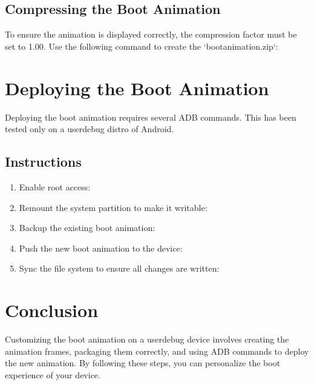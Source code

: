   \subsection{Compressing the Boot Animation}

  To ensure the animation is displayed correctly, the compression factor must be set to 1.00. Use the following command to create the `bootanimation.zip`:



  \section{Deploying the Boot Animation}

  Deploying the boot animation requires several ADB commands. This has been tested only on a \gls{userdebug} distro of Android.

  \subsection{Instructions \faCode}

  \begin{enumerate}
    \item Enable root access:


    \item Remount the system partition to make it writable:


    \item Backup the existing boot animation:


    \item Push the new boot animation to the device:


    \item Sync the file system to ensure all changes are written:

  \end{enumerate}
  \section{Conclusion}

  Customizing the boot animation on a userdebug device involves creating the animation frames, packaging them correctly, and using ADB commands to deploy the new animation. By following these steps, you can personalize the boot experience of your device.



